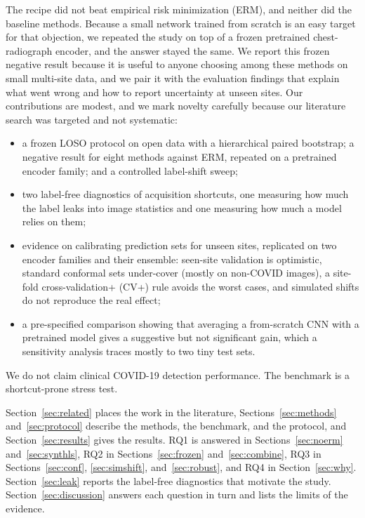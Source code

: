 \documentclass[journal]{IEEEtran}
\newcommand{\erm}{ERM}
\begin{document}
The recipe did not beat empirical risk minimization (ERM), and neither did the baseline methods. Because a small network trained from scratch is an easy target for that objection, we repeated the study on top of a frozen pretrained chest-radiograph encoder, and the answer stayed the same. We report this frozen negative result because it is useful to anyone choosing among these methods on small multi-site data, and we pair it with the evaluation findings that explain what went wrong and how to report uncertainty at unseen sites. Our contributions are modest, and we mark novelty carefully because our literature search was targeted and not systematic:
\begin{itemize}\setlength\itemsep{0pt}
  \item a frozen LOSO protocol on open data with a hierarchical paired bootstrap; a negative result for eight methods against \erm{}, repeated on a pretrained encoder family; and a controlled label-shift sweep;
  \item two label-free diagnostics of acquisition shortcuts, one measuring how much the label leaks into image statistics and one measuring how much a model relies on them;
  \item evidence on calibrating prediction sets for unseen sites, replicated on two encoder families and their ensemble: seen-site validation is optimistic, standard conformal sets under-cover (mostly on non-COVID images), a site-fold cross-validation+ (CV+) rule avoids the worst cases, and simulated shifts do not reproduce the real effect;
  \item a pre-specified comparison showing that averaging a from-scratch CNN with a pretrained model gives a suggestive but not significant gain, which a sensitivity analysis traces mostly to two tiny test sets.
\end{itemize}
We do not claim clinical COVID-19 detection performance. The benchmark is a shortcut-prone stress test.

Section~\ref{sec:related} places the work in the literature, Sections~\ref{sec:methods} and~\ref{sec:protocol} describe the methods, the benchmark, and the protocol, and Section~\ref{sec:results} gives the results. RQ1 is answered in Sections~\ref{sec:noerm} and~\ref{sec:synthls}, RQ2 in Sections~\ref{sec:frozen} and~\ref{sec:combine}, RQ3 in Sections~\ref{sec:conf}, \ref{sec:simshift}, and~\ref{sec:robust}, and RQ4 in Section~\ref{sec:why}. Section~\ref{sec:leak} reports the label-free diagnostics that motivate the study. Section~\ref{sec:discussion} answers each question in turn and lists the limits of the evidence.
\end{document}
